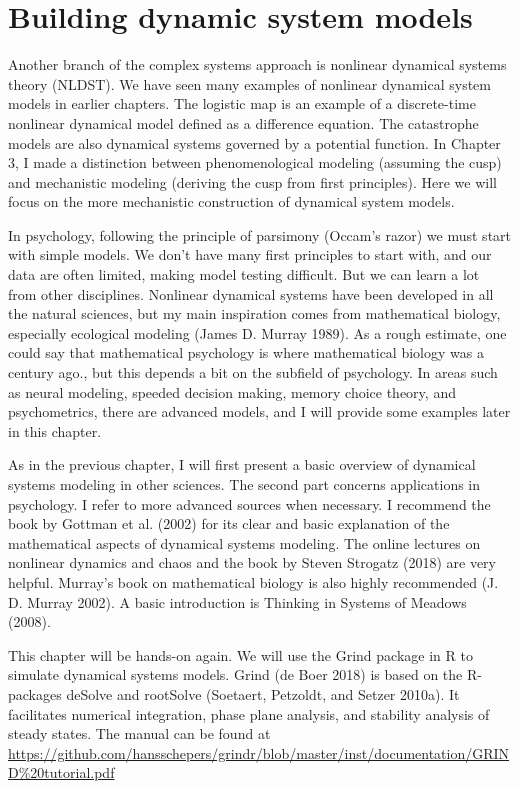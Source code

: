 \documentclass[
  letterpaper,
]{scrbook}
\begin{document}

\hypertarget{building-dynamic-system-models}{%
\chapter{Building dynamic system
models}\label{building-dynamic-system-models}}

Another branch of the complex systems approach is nonlinear dynamical
systems theory (NLDST). We have seen many examples of nonlinear
dynamical system models in earlier chapters. The logistic map is an
example of a discrete-time nonlinear dynamical model defined as a
difference equation. The catastrophe models are also dynamical systems
governed by a potential function. In Chapter 3, I made a distinction
between phenomenological modeling (assuming the cusp) and mechanistic
modeling (deriving the cusp from first principles). Here we will focus
on the more mechanistic construction of dynamical system models.

In psychology, following the principle of parsimony (Occam's razor) we
must start with simple models. We don't have many first principles to
start with, and our data are often limited, making model testing
difficult. But we can learn a lot from other disciplines. Nonlinear
dynamical systems have been developed in all the natural sciences, but
my main inspiration comes from mathematical biology, especially
ecological modeling (James D. Murray 1989). As a rough estimate, one
could say that mathematical psychology is where mathematical biology was
a century ago., but this depends a bit on the subfield of psychology. In
areas such as neural modeling, speeded decision making, memory choice
theory, and psychometrics, there are advanced models, and I will provide
some examples later in this chapter.

As in the previous chapter, I will first present a basic overview of
dynamical systems modeling in other sciences. The second part concerns
applications in psychology. I refer to more advanced sources when
necessary. I recommend the book by Gottman et al. (2002) for its clear
and basic explanation of the mathematical aspects of dynamical systems
modeling. The online lectures on nonlinear dynamics and chaos and the
book by Steven Strogatz (2018) are very helpful. Murray's book on
mathematical biology is also highly recommended (J. D. Murray 2002). A
basic introduction is Thinking in Systems of Meadows (2008).

This chapter will be hands-on again. We will use the Grind package in R
to simulate dynamical systems models. Grind (de Boer 2018) is based on
the R-packages deSolve and rootSolve (Soetaert, Petzoldt, and Setzer
2010a). It facilitates numerical integration, phase plane analysis, and
stability analysis of steady states. The manual can be found at
\url{https://github.com/hansschepers/grindr/blob/master/inst/documentation/GRIND\%20tutorial.pdf}
\end{document}
